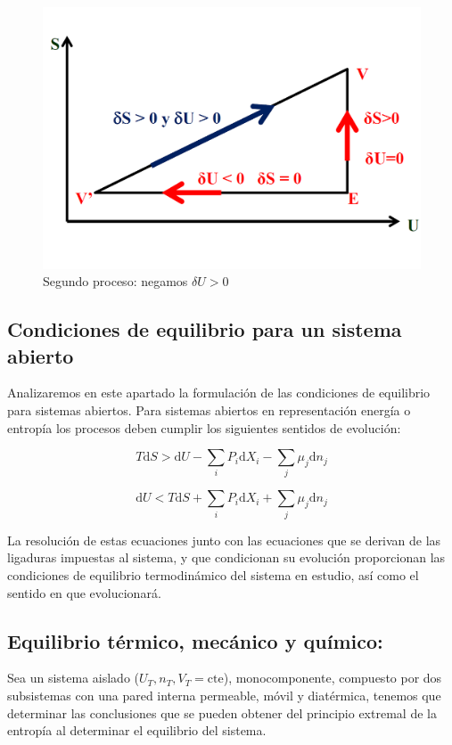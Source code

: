 \documentclass[12pt,a4paper]{article}
\newcommand{\D}{\mathrm{d}}
\newcommand{\cte}{\mathrm{cte}}
\begin{document}
\begin{itemize}
\begin{figure}[h!] \centering 
\includegraphics[scale=0.5]{demostracion-2.png}
\caption{Segundo proceso: negamos $\delta U > 0$}
\end{figure}
\end{itemize}

\subsection{Condiciones de equilibrio para un sistema abierto}

Analizaremos en este apartado la formulación de las condiciones de equilibrio para sistemas abiertos. Para sistemas abiertos en representación energía o entropía los procesos deben cumplir los siguientes sentidos de evolución:

\begin{equation}
T \D S > \D U - \sum_i P_i \D X_i - \sum_j \mu_j \D n_j
\end{equation}

\begin{equation}
\D U  < T \D S + \sum_i P_i \D X_i + \sum_j \mu_j \D n_j
\end{equation}

La resolución de estas ecuaciones junto con las ecuaciones que se derivan de las ligaduras impuestas al sistema, y que condicionan su evolución proporcionan las condiciones de equilibrio termodinámico del sistema en estudio, así como el sentido en que evolucionará.

\subsection{Equilibrio térmico, mecánico y químico:}
Sea un sistema aislado ($U_T, n_T, V_T = \cte$), monocomponente, compuesto por dos subsistemas con una pared interna permeable, móvil y diatérmica, tenemos que determinar las conclusiones que se pueden obtener del principio extremal de la entropía al determinar el equilibrio del sistema. \\
\end{document}
